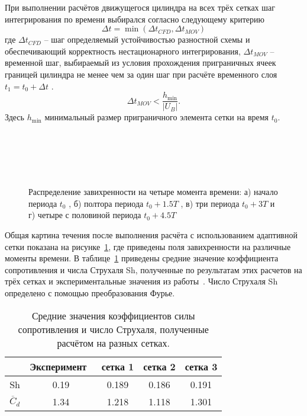 При выполнении расчётов движущегося цилиндра на всех трёх сетках шаг интегрирования по времени выбирался согласно следующему критерию
\begin{equation}\label{eq:time_step}
\Delta t  =\min(\Delta t_{CFD}, \Delta t_{MOV})
\end{equation}
где   $\Delta t_{CFD}$ – шаг определяемый устойчивостью разностной схемы и обеспечивающий корректность нестационарного интегрирования,   $\Delta t_{MOV}$ – временной шаг, выбираемый из условия прохождения приграничных ячеек границей цилиндра не менее чем за один шаг при расчёте временного слоя  $t_1 = t_0+\Delta t$ 
.\begin{equation}\label{eq:time_step_mov}
\Delta t_{MOV} < \frac{h_{\mathrm{min}}}{|U_B|}.
\end{equation}
Здесь  $h_{\mathrm{min}}$ минимальный размер приграничного элемента сетки на время  $t_0$.
\begin{figure}
	{\centering
		\\
		\\
		\\
		\\
	}
	\caption[Распределение завихренности на четыре момента времени]{Распределение завихренности на четыре момента времени: а) начало периода $t_0$ , б) полтора периода $t_0+1.5T$ , в) три периода $t_0+3T$ и г) четыре с половиной периода $t_0+4.5T$}
	\label{fig:vorticity}
\end{figure} 

Общая картина течения после выполнения расчёта с использованием адаптивной сетки показана на рисунке~\ref{fig:vorticity}, где приведены поля завихренности на различные моменты времени. В таблице~\ref{tabl:table} приведены средние значение коэффициента сопротивления  и числа Струхаля Sh, полученные по результатам этих расчетов на трёх сетках и экспериментальные значения из работы~\cite{henderson1997nonlinear}. Число Струхаля  Sh определено с помощью преобразования Фурье.
\begin{table}[htbp]
	\centering
	\changecaptionwidth\captionwidth{15cm}
	\caption{Средние значения коэффициентов силы сопротивления и число Струхаля, полученные расчётом на разных сетках.}	\label{tabl:table}%
	\begin{tabular}{|c|c|c|c|c|}
	  \hline
	  \hline
	& Эксперимент~\cite{henderson1997nonlinear} & сетка 1 & сетка 2 & сетка 3 \\ \hline
	Sh               & 0.19        & 0.189   & 0.186   & 0.191   \\ 
	$\overline{C}_d$ & 1.34        & 1.218   & 1.118   & 1.301   \\  \hline
	\hline
	\end{tabular}
\end{table}
\clearpage